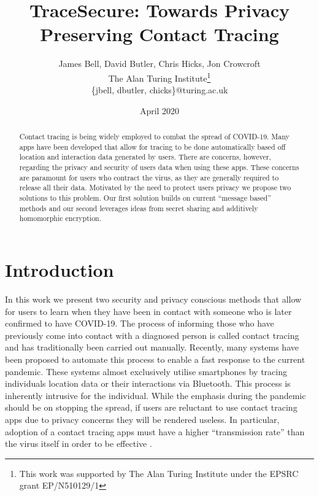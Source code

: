 \documentclass{article}
\title{TraceSecure: Towards Privacy Preserving Contact Tracing}
\author{James Bell, David Butler, Chris Hicks, Jon Crowcroft\\\small{The Alan Turing Institute\thanks{This work was supported by The Alan Turing Institute under the EPSRC grant EP/N510129/1}}\\
\small{\{jbell, dbutler, chicks\}@turing.ac.uk}}
\date{April 2020}
\begin{document}
\maketitle

\begin{abstract}
    Contact tracing is being widely employed to combat the spread of COVID-19. Many apps have been developed that allow for tracing to be done automatically based off location and interaction data generated by users. There are concerns, however, regarding the privacy and security of users data when using these apps. These concerns are paramount for users who contract the virus, as they are generally required to release all their data. Motivated by the need to protect users privacy we propose two solutions to this problem. Our first solution builds on current ``message based'' methods and our second leverages ideas from secret sharing and additively homomorphic encryption. 
\end{abstract}

\section{Introduction}

In this work we present two security and privacy conscious methods that allow for users to learn when they have been in contact with someone who is later confirmed to have COVID-19. The process of informing those who have previously come into contact with a diagnosed person is called contact tracing and has traditionally been carried out manually. Recently, many systems have been proposed to automate this process to enable a fast response to the current pandemic. These systems almost exclusively utilise smartphones by tracing individuals location data or their interactions via Bluetooth. This process is inherently intrusive for the individual. While the emphasis during the pandemic should be on stopping the spread, if users are reluctant to use contact tracing apps due to privacy concerns they will be rendered useless. In particular, adoption of a contact tracing apps must have a higher ``transmission rate'' than the virus itself in order to be effective \cite{DBLP:journals/corr/abs-2003-11511}. 
\end{document}
